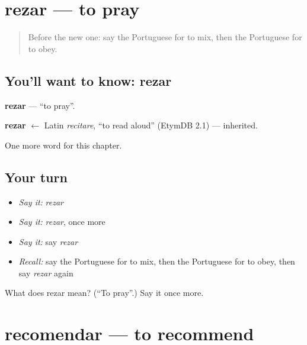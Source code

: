 \section[rezar]{rezar — to pray}

\label{lesson:PT-C178-rezar}



\begin{quote}
Before the new one: say the Portuguese for to mix, then the Portuguese for to obey.
\end{quote}

\subsection*{You'll want to know: rezar}
\textbf{rezar} — \textquotedblleft{}to pray\textquotedblright{}.

\begin{cousinweb}
\textbf{rezar} $\leftarrow$ Latin \emph{recitare}, \textquotedblleft{}to read aloud\textquotedblright{} (EtymDB 2.1) — inherited.
\end{cousinweb}

\begin{grammarlens}[title={What you've built}]
One more word for this chapter.
\end{grammarlens}

\subsection*{Your turn}
\begin{itemize}
\raggedright
  \item \emph{Say it:} \emph{rezar}
  \item \emph{Say it:} \emph{rezar}, once more
  \item \emph{Say it:} say \emph{rezar}
  \item \emph{Recall:} say the Portuguese for to mix, then the Portuguese for to obey, then say \emph{rezar} again
\end{itemize}

\begin{tcolorbox}[breakable,colback=teal!4,colframe=teal!35!black,title={Before you move on}]
What does rezar mean? (\textquotedblleft{}To pray\textquotedblright{}.) Say it once more.
\end{tcolorbox}
\section[recomendar]{recomendar — to recommend}


